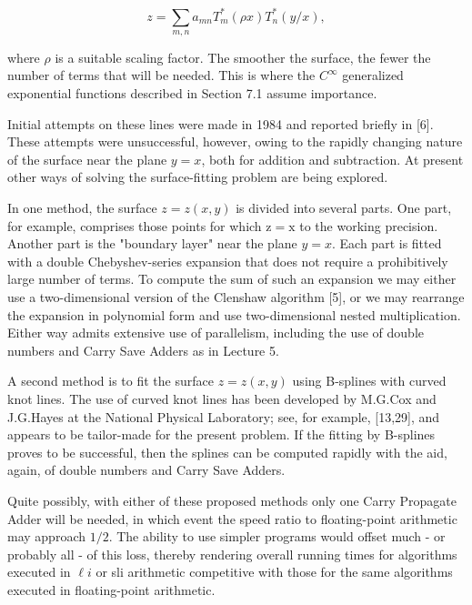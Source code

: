 \documentclass[10pt]{article}
\begin{document}
$$
z=\sum_{m, n} a_{m n} T_{m}^{*}(\rho x) T_{n}^{*}(y / x),
$$

where $\rho$ is a suitable scaling factor. The smoother the surface, the fewer the number of terms that will be needed. This is where the $C^{\infty}$ generalized exponential functions described in Section 7.1 assume importance.

Initial attempts on these lines were made in 1984 and reported briefly in [6]. These attempts were unsuccessful, however, owing to the rapidly changing nature of the surface near the plane $y=x$, both for addition and subtraction. At present other ways of solving the surface-fitting problem are being explored.

In one method, the surface $z=z(x, y)$ is divided into several parts. One part, for example, comprises those points for which $\mathrm{z}=\mathrm{x}$ to the working precision. Another part is the "boundary layer" near the plane $y=x$. Each part is fitted with a double Chebyshev-series expansion that does not require a prohibitively large number of terms. To compute the sum of such an expansion we may either use a two-dimensional version of the Clenshaw algorithm [5], or we may rearrange the expansion in polynomial form and use two-dimensional nested multiplication. Either way admits extensive use of parallelism, including the use of double numbers and Carry Save Adders as in Lecture 5.

A second method is to fit the surface $z=z(x, y)$ using B-splines with curved knot lines. The use of curved knot lines has been developed by M.G.Cox and J.G.Hayes at the National Physical Laboratory; see, for example, [13,29], and appears to be tailor-made for the present problem. If the fitting by B-splines proves to be successful, then the splines can be computed rapidly with the aid, again, of double numbers and Carry Save Adders.

Quite possibly, with either of these proposed methods only one Carry Propagate Adder will be needed, in which event the speed ratio to floating-point arithmetic may approach $1 / 2$. The ability to use simpler programs would offset much - or probably all - of this loss, thereby rendering overall running times for algorithms executed in $\ell i$ or sli arithmetic competitive with those for the same algorithms executed in floating-point arithmetic.
\end{document}
